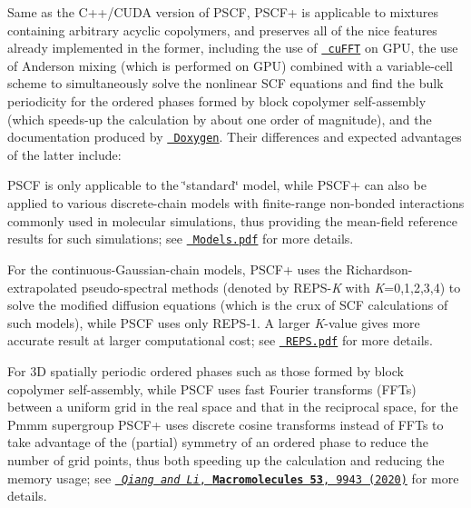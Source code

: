 Same as the C++/\+C\+U\+DA version of P\+S\+CF, P\+S\+C\+F+ is applicable to mixtures containing arbitrary acyclic copolymers, and preserves all of the nice features already implemented in the former, including the use of \href{https://docs.nvidia.com/cuda/cufft/index.html}{\texttt{ cu\+F\+FT}} on G\+PU, the use of Anderson mixing (which is performed on G\+PU) combined with a variable-\/cell scheme to simultaneously solve the nonlinear S\+CF equations and find the bulk periodicity for the ordered phases formed by block copolymer self-\/assembly (which speeds-\/up the calculation by about one order of magnitude), and the documentation produced by \href{https://www.doxygen.nl/}{\texttt{ Doxygen}}. Their differences and expected advantages of the latter include\+: 
\begin{DoxyItemize}
\item P\+S\+CF is only applicable to the \char`\"{}standard\char`\"{} model, while P\+S\+C\+F+ can also be applied to various discrete-\/chain models with finite-\/range non-\/bonded interactions commonly used in molecular simulations, thus providing the mean-\/field reference results for such simulations; see \href{https://github.com/qwcsu/PSCFplus/blob/master/doc/notes/Models.pdf}{\texttt{ Models.\+pdf}} for more details.  
\item For the continuous-\/\+Gaussian-\/chain models, P\+S\+C\+F+ uses the Richardson-\/extrapolated pseudo-\/spectral methods (denoted by R\+E\+P\+S-\/{\itshape K} with {\itshape K}=0,1,2,3,4) to solve the modified diffusion equations (which is the crux of S\+CF calculations of such models), while P\+S\+CF uses only R\+E\+P\+S-\/1. A larger {\itshape K}-\/value gives more accurate result at larger computational cost; see \href{https://github.com/qwcsu/PSCFplus/blob/master/doc/notes/REPS.pdf}{\texttt{ R\+E\+P\+S.\+pdf}} for more details.  
\item For 3D spatially periodic ordered phases such as those formed by block copolymer self-\/assembly, while P\+S\+CF uses fast Fourier transforms (F\+F\+Ts) between a uniform grid in the real space and that in the reciprocal space, for the Pmmm supergroup P\+S\+C\+F+ uses discrete cosine transforms instead of F\+F\+Ts to take advantage of the (partial) symmetry of an ordered phase to reduce the number of grid points, thus both speeding up the calculation and reducing the memory usage; see \href{https://pubs.acs.org/doi/10.1021/acs.macromol.0c01974}{\texttt{ {\itshape Qiang and Li}, {\bfseries{Macromolecules 53}}, 9943 (2020)}} for more details.  

\end{DoxyItemize}
